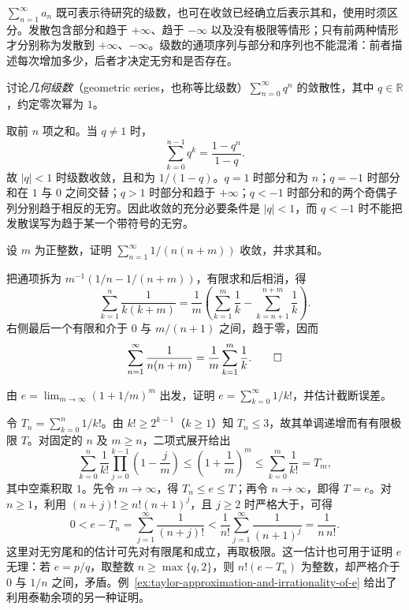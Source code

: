 \documentclass[UTF8,12pt,a4paper,fontset=fandol]{ctexbook}
\begin{document}
$\sum_{n=1}^{\infty}a_n$ 既可表示待研究的级数，也可在收敛已经确立后表示其和，使用时须区分。发散包含部分和趋于 $+\infty$、趋于 $-\infty$ 以及没有极限等情形；只有前两种情形才分别称为发散到 $+\infty$、$-\infty$。级数的通项序列与部分和序列也不能混淆：前者描述每次增加多少，后者才决定无穷和是否存在。

\begin{example}
\label{ex:geometric-numerical-series}
讨论\emph{几何级数}（geometric series，也称等比级数）$\sum_{n=0}^{\infty}q^n$ 的敛散性，其中 $q\in\mathbb R$，约定零次幂为 $1$。
\end{example}

\begin{solve}
取前 $n$ 项之和。当 $q\neq1$ 时，
\[
    \sum_{k=0}^{n-1}q^k=\frac{1-q^n}{1-q}.
\]
故 $|q|<1$ 时级数收敛，且和为 $1/(1-q)$。$q=1$ 时部分和为 $n$；$q=-1$ 时部分和在 $1$ 与 $0$ 之间交替；$q>1$ 时部分和趋于 $+\infty$；$q<-1$ 时部分和的两个奇偶子列分别趋于相反的无穷。因此收敛的充分必要条件是 $|q|<1$，而 $q<-1$ 时不能把发散误写为趋于某一个带符号的无穷。
\end{solve}

\begin{example}
\label{ex:telescoping-shifted-harmonic-series}
设 $m$ 为正整数，证明 $\sum_{n=1}^{\infty}1/(n(n+m))$ 收敛，并求其和。
\end{example}

\begin{solve}
把通项拆为 $m^{-1}(1/n-1/(n+m))$，有限求和后相消，得
\[
    \sum_{k=1}^{n}\frac1{k(k+m)}
    =\frac1m\left(\sum_{k=1}^{m}\frac1k
                     -\sum_{k=n+1}^{n+m}\frac1k\right).
\]
右侧最后一个有限和介于 $0$ 与 $m/(n+1)$ 之间，趋于零，因而
\[
    \sum_{n=1}^{\infty}\frac1{n(n+m)}=\frac1m\sum_{k=1}^{m}\frac1k.
    \qedhere
\]
\end{solve}

\begin{example}
\label{ex:factorial-series-for-e}
由 $e=\lim_{m\to\infty}(1+1/m)^m$ 出发，证明 $e=\sum_{k=0}^{\infty}1/k!$，并估计截断误差。
\end{example}

\begin{solve}
令 $T_n=\sum_{k=0}^n1/k!$。由 $k!\geq2^{k-1}$（$k\geq1$）知 $T_n\leq3$，故其单调递增而有有限极限 $T$。对固定的 $n$ 及 $m\geq n$，二项式展开给出
\[
    \sum_{k=0}^n\frac1{k!}
       \prod_{j=0}^{k-1}\left(1-\frac jm\right)
    \leq\left(1+\frac1m\right)^m
    \leq\sum_{k=0}^m\frac1{k!}=T_m,
\]
其中空乘积取 $1$。先令 $m\to\infty$，得 $T_n\leq e\leq T$；再令 $n\to\infty$，即得 $T=e$。对 $n\geq1$，利用 $(n+j)!\geq n!(n+1)^j$，且 $j\geq2$ 时严格大于，可得
\begin{equation}
    0<e-T_n=\sum_{j=1}^{\infty}\frac1{(n+j)!}
      <\frac1{n!}\sum_{j=1}^{\infty}\frac1{(n+1)^j}
      =\frac1{n\,n!}.
    \label{eq:factorial-series-tail-bound}
\end{equation}
这里对无穷尾和的估计可先对有限尾和成立，再取极限。这一估计也可用于证明 $e$ 无理：若 $e=p/q$，取整数 $n\geq\max\{q,2\}$，则 $n!(e-T_n)$ 为整数，却严格介于 $0$ 与 $1/n$ 之间，矛盾。例~\ref{ex:taylor-approximation-and-irrationality-of-e} 给出了利用泰勒余项的另一种证明。
\end{solve}
\end{document}
